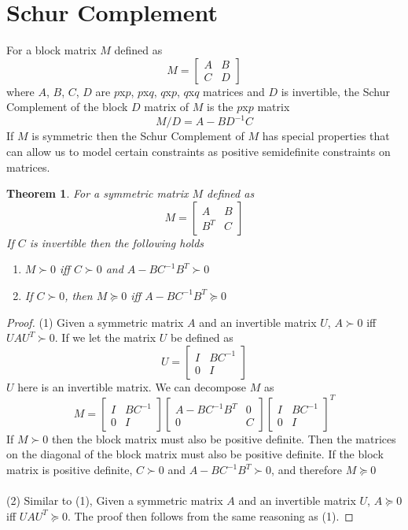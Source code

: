 \documentclass{article}
\newtheorem{theorem}{Theorem}
\begin{document}
\section{Schur Complement}
For a block matrix $M$ defined as 
\[M = \begin{bmatrix}
  A & B \\
  C & D
  \end{bmatrix}\]
where $A$, $B$, $C$, $D$ are $p$x$p$,  $p$x$q$, $q$x$p$, $q$x$q$ matrices and $D$ is invertible, the Schur Complement of the block $D$ matrix of $M$ is the $p$x$p$ matrix
\[M/D = A - BD^{-1}C\]
If $M$ is symmetric then the Schur Complement of $M$ has special properties that can allow us to model certain constraints as positive semidefinite constraints on matrices. 
\begin{theorem}
For a symmetric matrix $M$ defined as
\[M = \begin{bmatrix}
  A & B \\
  B^T & C
  \end{bmatrix}\]
If $C$ is invertible then the following holds
\begin{enumerate}
\item $M \succ 0$ iff $C \succ 0$ and $A - BC^{-1}B^T \succ 0$
\item If $C \succ 0$, then $M \succeq 0$ iff $A-BC^{-1}B^T \succeq 0$
\end{enumerate}
\end{theorem} 
\begin{proof}
(1) Given a symmetric matrix $A$ and an invertible matrix $U$, $A \succ 0$ iff $UAU^T \succ 0$. If we let the matrix $U$ be defined as
\[U = 
\begin{bmatrix}
  I & BC^{-1} \\
  0 & I
\end{bmatrix}
\]
$U$ here is an invertible matrix. We can decompose $M$ as
\[
M = 
\begin{bmatrix}
  I & BC^{-1} \\
  0 & I
\end{bmatrix}
\begin{bmatrix}
  A - BC^{-1}B^T & 0 \\
  0 & C
\end{bmatrix}
\begin{bmatrix}
  I & BC^{-1} \\
  0 & I
\end{bmatrix}^T
\]
If $M \succ 0$ then the block matrix must also be positive definite. Then the matrices on the diagonal of the block matrix must also be positive definite. If the block matrix is positive definite, $C \succ 0$ and $A - BC^{-1}B^T \succ 0$, and therefore $M \succeq 0$\\\\
(2) Similar to (1), Given a symmetric matrix $A$ and an invertible matrix $U$, $A \succeq 0$ iff $UAU^T \succeq 0$. The proof then follows from the same reasoning as (1).
\end{proof}
\clearpage
\end{document}
